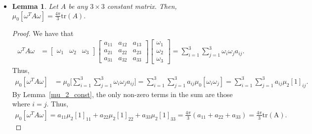 \documentclass[10pt]{article}
\newtheorem{lemma}{Lemma}[section]
\begin{document}
\begin{itemize}
      \item \begin{lemma}
        Let $A$ be any $3 \times 3$ constant matrix. Then, $\mu_0[\omega^T A \omega] = \frac{4\pi}{3} \mathrm{tr}(A).$
      \end{lemma}
      \begin{proof}
        We have that
        \begin{align*}
          \omega^T A \omega
          &= \begin{bmatrix} \omega_1 & \omega_2 & \omega_3 \end{bmatrix}
          \begin{bmatrix}
            a_{11} & a_{12} & a_{13} \\
            a_{21} & a_{22} & a_{23} \\
            a_{31} & a_{32} & a_{33}
          \end{bmatrix}
          \begin{bmatrix} \omega_1 \\ \omega_2 \\ \omega_3 \end{bmatrix}
          = \sum_{i=1}^3 \sum_{j=1}^3 \omega_i \omega_j a_{ij}.
        \end{align*}
        Thus,
        \begin{align*}
          \mu_0[\omega^T A \omega] 
          &= \mu_0 \bigg[ \sum_{i=1}^3 \sum_{j=1}^3 \omega_i \omega_j a_{ij} \bigg]
          =  \sum_{i=1}^3 \sum_{j=1}^3 a_{ij} \mu_0 [\omega_i \omega_j ]
          =  \sum_{i=1}^3 \sum_{j=1}^3 a_{ij} \mu_2 [ 1 ]_{ij}.
        \end{align*}
        By Lemma~\ref{mu_2_const}, the only non-zero terms in the sum are those where
        $i = j$. Thus,
        \begin{align*}
            \mu_0[\omega^T A \omega] = a_{11} \mu_2[1]_{11} + a_{22} \mu_2[1]_{22} + a_{33} \mu_2[1]_{33}
            = \frac{4\pi}{3} (a_{11} + a_{22} + a_{33}) = \frac{4\pi}{3} \mathrm{tr(A)}.
        \end{align*}
      \end{proof}
      

\end{itemize}
\end{document}
